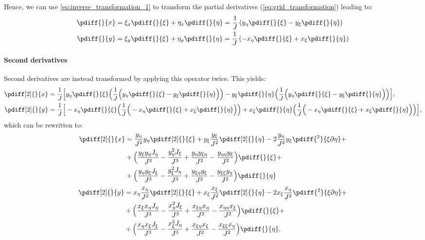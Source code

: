 Hence, we can use \autoref{eq:inverse_transformation_1} to transform the partial derivatives (\autoref{eq:grid_transformation}) leading to:
	\begin{align}\label{trans}
		\pdiff{}{x}
		&=\xi_x\pdiff{}{\xi}
		+ \eta_x\pdiff{}{\eta}
		=\frac{1}{J}\left(y_{\eta} \pdiff{}{\xi}
		-y_{\xi}\pdiff{}{\eta}\right)
\\
		\pdiff{}{y}
		&=\xi_y\pdiff{}{\xi}
		+\eta_y \pdiff{}{\eta}
		=\frac{1}{J}\left(-x_{\eta}\pdiff{}{\xi}
		+x_{\xi}\pdiff{}{\eta}
		\right)
	\end{align}
\paragraph*{Second derivatives}
Second derivatives are instead transformed by applying this operator twice.
This yields:
%
\begin{align}
	\pdiff[2]{}{x}
	&=\frac{1}{J}\Big[y_{\eta} \pdiff{}{\xi} \Big( \frac{1}{J}\Big(y_{\eta} \pdiff{}{\xi}
	-y_{\xi}\pdiff{}{\eta}\Big)\Big)
	-y_{\xi}\pdiff{}{\eta} \Big( \frac{1}{J}\Big(y_{\eta} \pdiff{}{\xi}
	-y_{\xi}\pdiff{}{\eta}\Big) \Big) \Big],
\\
\pdiff[2]{}{y}
		&=\frac{1}{J}\Big[-x_{\eta}\pdiff{}{\xi} \Big( \frac{1}{J}\Big(-x_{\eta}\pdiff{}{\xi}
		+x_{\xi}\pdiff{}{\eta}
		\Big)\Big)
		+x_{\xi}\pdiff{}{\eta} \Big(\frac{1}{J}\Big(-x_{\eta}\pdiff{}{\xi}
		+x_{\xi}\pdiff{}{\eta}
		\Big) \Big)
		\Big],
\end{align}
%
which can be rewritten to:
%
\begin{align}
	\begin{aligned}
		\pdiff[2]{}{x} & =
		\frac{y_{\eta}}{J^2} y_{\eta} \pdiff[2]{}{\xi}
		+ y_{\xi} \frac{y_{\xi}}{J^2} \pdiff[2]{}{\eta}
		- 2\frac{y_{\eta}}{J^2} y_{\xi}\pdiff{^2}{\xi \partial \eta} + \\
		& +  \Big(
		\frac{y_{\xi} y_{\eta}J_{\eta}}{J^3}
		- \frac{y_{\eta}^2 J_{\xi}}{J^3}
		+ \frac{y_{\eta}y_{\xi\eta}}{J^2}
		-  \frac{y_{\eta \eta} y_{\xi}}{J^2}
		\Big)\pdiff{}{\xi} +\\
		& + \Big(
		\frac{y_{\eta} y_{\xi} J_{\xi}}{J^3}
		- \frac{y_{\xi}^2 J_{\eta}}{J^3}
		+  \frac{y_{\xi \eta}y_{\xi}}{J^2}
		- \frac{ y_{\xi\xi} y_{\eta}}{J^2}
		\Big)\pdiff{}{\eta}
	\end{aligned}
\end{align}
\begin{align}
    \begin{aligned}
		\pdiff[2]{}{y} & =
	    x_{\eta}\frac{x_{\eta}}{J^2}\pdiff[2]{}{\xi}
		+ x_{\xi}\frac{x_{\xi}}{J^2}\pdiff[2]{}{\eta}
		- 2 x_{\xi}\frac{x_{\eta}}{J^2}\pdiff{^2}{\xi \partial\eta} + \\
		& + \Big(
		\frac{x_{\xi}x_{\eta}J_{\eta}}{J^3}
		-\frac{x_{\eta}^2J_{\xi}}{J^3}
		+ \frac{x_{\xi\eta} x_{\eta}}{J^2}
		- \frac{x_{\eta\eta}x_{\xi}}{J^2}
		\Big) \pdiff{}{\xi} + \\
		&+ \Big(
		\frac{x_{\eta}x_{\xi}J_{\xi}}{J^3}
		- \frac{ x_{\xi}^2J_{\eta}}{J^3}
		+ \frac{x_{\xi\eta}x_{\xi}}{J^2}
		- \frac{x_{\xi \xi}x_{\eta}}{J^2}
		\Big) \pdiff{}{\eta},
    \end{aligned}
\end{align}

